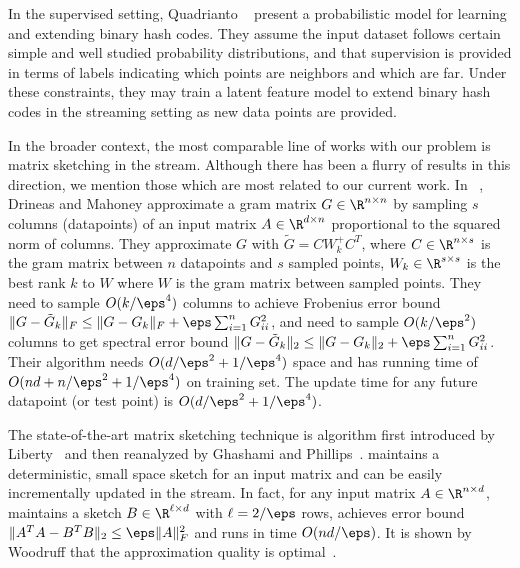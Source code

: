 \documentclass{sig-alternate}
\begin{document}
In the supervised setting, Quadrianto \etal~\cite{quadrianto} present a probabilistic model for learning and extending binary hash codes. They assume the input dataset follows certain simple and well studied probability distributions, and that supervision is provided in terms of labels indicating which points are neighbors and which are far. Under these constraints, they may train a latent feature model to extend binary hash codes in the streaming setting as new data points are provided.

In the broader context, the most comparable line of works with our problem is matrix sketching in the stream.
Although there has been a flurry of results in this direction\cite{numerical,ghashami1,Lib12}, we mention those which are most related to our current work.
In ~\cite{drineas2005nystrom}, Drineas and Mahoney approximate a gram matrix $G \in \R^{n \times n}$ by sampling $s$ columns (datapoints) of an input matrix $A \in \R^{d \times n}$ proportional to the squared norm of columns. 
They approximate $G$ with $\tilde{G} = C W_k^{+} C^T$, where $C \in \R^{n \times s}$ is the gram matrix between $n$ datapoints and $s$ sampled points, $W_k \in \R^{s \times s}$ is the best rank $k$ to $W$ where $W$ is the gram matrix between sampled points. 
They need to sample $O(k/\eps^4)$ columns to achieve Frobenius error bound $\|G - \tilde{G}_k\|_{F} \leq \|G - G_k\|_{F} + \eps \sum_{i=1}^n G_{ii}^2$, and need to sample $O(k/\eps^2)$ columns to get spectral error bound $\|G - \tilde{G}_k\|_{2} \leq \|G - G_k\|_{2} + \eps \sum_{i=1}^n G_{ii}^2$. Their algorithm needs $O(d/\eps^2 + 1/\eps^4)$ space and has running time of $O(nd + n/\eps^2 + 1/\eps^4)$ on training set. The update time for any future datapoint (or test point) is $O(d/\eps^2 + 1/\eps^4)$.

The state-of-the-art matrix sketching technique is \FD algorithm first introduced by Liberty~\cite{Lib12} and then reanalyzed by Ghashami and Phillips~\cite{ghashami1}. \FD  maintains a deterministic, small space sketch for an input matrix and can be easily incrementally updated in the stream. In fact, for any input matrix $A \in \R^{n \times d}$, \FD maintains a sketch $B \in \R^{\ell \times d}$ with $\ell = 2/\eps$ rows, achieves error bound $\|A^TA - B^TB\|_2 \leq \eps \|A\|_F^2$ and runs in time $O(nd/\eps)$. It is shown by Woodruff that the approximation quality is optimal~\cite{lowerbound}. 
\end{document}

